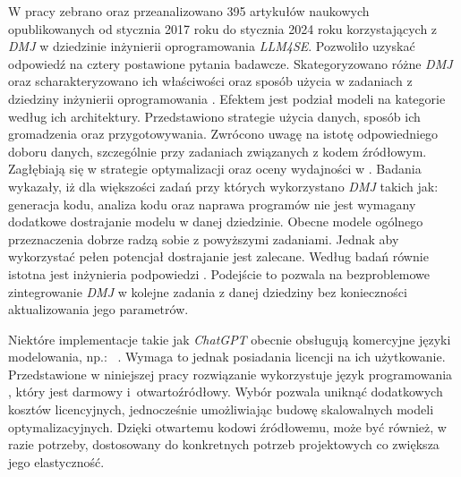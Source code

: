 W pracy \cite{10.1145/3695988} zebrano oraz przeanalizowano 395 artykułów naukowych opublikowanych od stycznia 2017 roku do stycznia 2024 roku korzystających z \textit{DMJ} w dziedzinie inżynierii oprogramowania \textit{LLM4SE}. Pozwoliło uzyskać odpowiedź na cztery postawione pytania badawcze. Skategoryzowano różne \textit{DMJ} oraz scharakteryzowano ich właściwości oraz sposób użycia w zadaniach z dziedziny inżynierii oprogramowania . Efektem jest podział modeli na kategorie według ich architektury. Przedstawiono strategie użycia danych, sposób ich gromadzenia oraz przygotowywania. Zwrócono uwagę na istotę odpowiedniego doboru danych, szczególnie przy zadaniach związanych z kodem źródłowym. Zagłębiają się w strategie optymalizacji oraz oceny wydajności  w . Badania wykazały, iż dla większości zadań przy których wykorzystano \textit{DMJ} takich jak: generacja kodu, analiza kodu oraz naprawa programów nie jest wymagany dodatkowe dostrajanie modelu  w danej dziedzinie. Obecne modele  ogólnego przeznaczenia dobrze radzą sobie z powyższymi zadaniami. Jednak aby wykorzystać pełen potencjał  dostrajanie jest zalecane. Według badań równie istotna jest inżynieria podpowiedzi . Podejście to pozwala na bezproblemowe zintegrowanie \textit{DMJ} w kolejne zadania z danej dziedziny bez konieczności aktualizowania jego parametrów.

Niektóre implementacje  takie jak \textit{ChatGPT} obecnie obsługują komercyjne języki modelowania, np.:~ \cite{ampl_chatgpt_guide}. Wymaga to jednak posiadania licencji na ich użytkowanie. 
Przedstawione w niniejszej pracy rozwiązanie wykorzystuje język programowania , który jest darmowy i~otwartoźródłowy. Wybór  pozwala uniknąć dodatkowych kosztów licencyjnych, jednocześnie umożliwiając budowę skalowalnych modeli optymalizacyjnych. Dzięki otwartemu kodowi źródłowemu,  może być również, w razie potrzeby, dostosowany do konkretnych potrzeb projektowych co zwiększa jego elastyczność.
